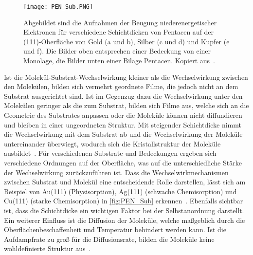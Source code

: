             \begin{figure}
                \centering
                \texttt{[image: PEN\_Sub.PNG]}
                \caption{Abgebildet sind die Aufnahmen der Beugung niederenergetischer Elektronen für verschiedene Schichtdicken von Pentacen auf der (111)-Oberfläche von Gold (a und b), Silber (c und d) und Kupfer (e und f).
                Die Bilder oben entsprechen einer Bedeckung von einer Monolage, die Bilder unten einer Bilage Pentacen.
                Kopiert aus~\cite{5A_4}.}
                \label{fig:PEN_Sub}
            \end{figure}
            Ist die Molekül-Substrat-Wechselwirkung kleiner als die Wechselwirkung zwischen den Molekülen, bilden sich vermehrt geordnete Filme, die jedoch nicht an dem Substrat ausgerichtet sind.
            Ist im Gegenzug dazu die Wechselwirkung unter den Molekülen geringer als die zum Substrat, bilden sich Filme aus, welche sich an die Geometrie des Substrates anpassen oder die Moleküle können nicht diffundieren und bleiben in einer ungeordneten Struktur.
            Mit steigender Schichtdicke nimmt die Wechselwirkung mit dem Substrat ab und die Wechselwirkung der Moleküle untereinander überwiegt, wodurch sich die Kristallstruktur der Moleküle ausbildet~\cite{5A_9}.
            Für verschiedenen Substrate und Bedeckungen ergeben sich verschiedene Ordnungen auf der Oberfläche, was auf die unterschiedliche Stärke der Wechselwirkung zurückzuführen ist.
            Dass die Wechselwirkmechanismen zwischen Substrat und Molekül eine entscheidende Rolle darstellen, lässt sich am Beispiel von Au(111) (Physisorption),  Ag(111) (schwache Chemisorption) und Cu(111) (starke Chemisorption) in \autoref{fig:PEN_Sub} erkennen~\cite{5A_4}.
            Ebenfalls sichtbar ist, dass die Schichtdicke ein wichtigen Faktor bei der Selbstanordnung darstellt.
            Ein weiterer Einfluss ist die Diffusion der Moleküle, welche maßgeblich durch die Oberflächenbeschaffenheit und Temperatur behindert werden kann.
            Ist die Aufdampfrate zu groß für die Diffusionsrate, bilden die Moleküle keine wohldefinierte Struktur aus~\cite{IF_15}.            

